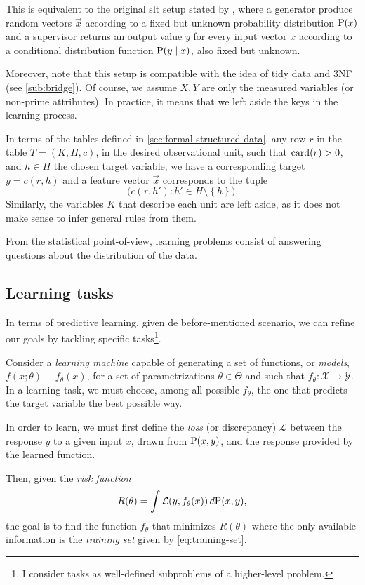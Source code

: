 This is equivalent to the original \gls{slt} setup stated by \textcite{Vapnik1999b}, where
a generator produce random vectors $\vec{x}$ according to a fixed but unknown
probability distribution $\Prob(x)$ and a supervisor returns an output value $y$ for every
input vector $x$ according to a conditional distribution function $\Prob(y \mid x)$, also fixed but
unknown.

Moreover, note that this setup is compatible with the idea of tidy data and 3NF (see
\cref{sub:bridge}). Of course, we assume $X, Y$ are only the measured variables (or
non-prime attributes).  In practice, it means that we left aside the keys in the learning
process.

In terms of the tables defined in \cref{sec:formal-structured-data}, any row $r$ in the
table $T = (K, H, c)$, in the desired observational unit, such that $\rowcard[r] > 0$, and
$h \in H$ the chosen target variable, we have a corresponding target $y = c(r, h)$ and a
feature vector $\vec{x}$ corresponds to the tuple $$\big(c(r, h') : h' \in H \setminus
\left\{ h \right\}\big)\text{.}$$  Similarly, the variables $K$ that describe each unit
are left aside, as it does not make sense to infer general rules from them.

From the statistical point-of-view, learning problems consist of answering questions about
the distribution of the data.

\subsection{Learning tasks}

In terms of predictive learning, given de before-mentioned scenario, we can refine our
goals by tackling specific tasks\footnote{I consider tasks as well-defined subproblems of
a higher-level problem.}.

Consider a \emph{learning machine} capable of generating a set of functions, or
\emph{models}, $f(x; \theta) \equiv f_\theta(x)$, for a set of parametrizations $\theta
\in \Theta$ and such that $f_\theta : \mathcal{X} \rightarrow \mathcal{Y}$.  In a learning
task, we must choose, among all possible $f_\theta$, the one that predicts the target
variable the best possible way.

In order to learn, we must first define the \emph{loss} (or discrepancy) $\mathcal{L}$
between the response $y$ to a given input $x$, drawn from $\Prob(x, y)$, and the
response provided by the learned function.

Then, given the \emph{risk function}
\begin{equation}
  \label{eq:risk}
  R(\theta) = \int \mathcal{L}(y, f_\theta(x))\, d\!\Prob(x, y)\text{,}
\end{equation}
the goal is to find the function $f_\theta$ that minimizes $R(\theta)$
where the only available information is the \emph{training set} given by \eqref{eq:training-set}.

